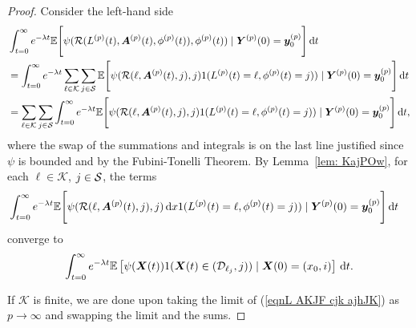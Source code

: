 \begin{proof}
	Consider the left-hand side 
	\begin{align}
		&\int_{t=0}^\infty e^{-\lambda t}\mathbb E\Bigg[\psi( \mathcal R(L^{(p)}(t),\boldsymbol A^{(p)}(t),\phi^{(p)}(t)),\phi^{(p)}(t) )   \mid 
		  \boldsymbol Y^{(p)}(0)=\boldsymbol y_0^{(p)} \Bigg] \, \mathrm{d} t \nonumber 
		\\&= \int_{t=0}^\infty e^{-\lambda t}\sum_{\ell\in\mathcal K}\sum_{j\in\mathcal S}\mathbb E\Bigg[\psi( \mathcal R(\ell,\boldsymbol A^{(p)}(t),j),j )  1({L}^{(p)}(t)=\ell,\phi^{(p)}(t)=j))  \mid \nonumber
		 \boldsymbol Y^{(p)}(0)=\boldsymbol y_0^{(p)} \Bigg] \, \mathrm{d} t \nonumber 
		\\&= \sum_{\ell\in\mathcal K}\sum_{j\in\mathcal S}\int_{t=0}^\infty e^{-\lambda t}\mathbb E\Bigg[ \psi( \mathcal R(\ell,\boldsymbol A^{(p)}(t),j),j )1({L}^{(p)}(t)=\ell,\phi^{(p)}(t)=j))  \mid 
		 \boldsymbol Y^{(p)}(0)=\boldsymbol y_0^{(p)} \Bigg] \, \mathrm{d} t, \label{eqnL AKJF cjk ajhJK}
	\end{align}
	where the swap of the summations and integrals is on the last line justified since \(\psi\) is bounded and by the Fubini-Tonelli Theorem. By Lemma~\ref{lem: KajPOw}, for each \(\ell\in\mathcal K\), \(j\in\mathcal{S}\), the terms 
	 \begin{align}
	 	&\int_{t=0}^\infty e^{-\lambda t}\mathbb E\Bigg[\psi( \mathcal R(\ell,\boldsymbol A^{(p)}(t),j), j )\, \mathrm{d} x 1({L}^{(p)}(t)=\ell,\phi^{(p)}(t)=j))  \mid \nonumber
		 \boldsymbol Y^{(p)}(0)=\boldsymbol y_0^{(p)} \Bigg] \, \mathrm{d} t
	\end{align}
		converge to 
	\[\int_{t=0}^\infty e^{-\lambda t}  \mathbb E\left[\psi({\boldsymbol X}(t) )1(\boldsymbol X(t)\in(\mathcal D_{\ell_j},j))\mid \boldsymbol X(0)=(x_0,i) \right] \, \mathrm{d} t.\]
	
	If \(\mathcal K\) is finite, we are done upon taking the limit of (\ref{eqnL AKJF cjk ajhJK}) as \(p\to\infty\) and swapping the limit and the sums. 
	

\end{proof}
